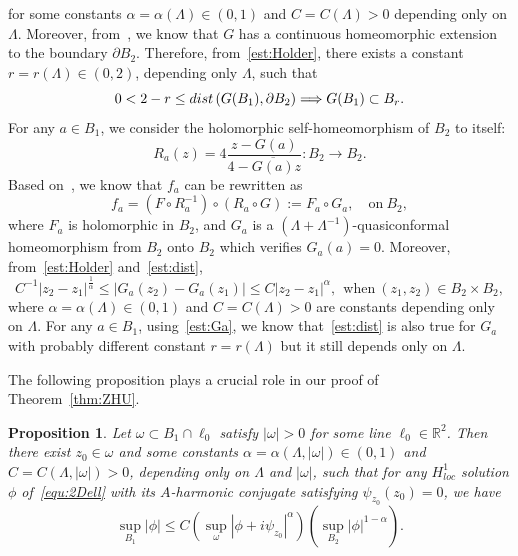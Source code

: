 \documentclass[a4paper,reqno]{amsart}
\newtheorem{proposition}[theorem]{Proposition}
\theoremstyle{definition}
\numberwithin{equation}{section}
\begin{document}
        for some constants $\alpha=\alpha(\Lambda)\in (0,1)$ and $C=C(\Lambda)>0$ depending only on $\Lambda$. Moreover, from~\cite[Corollary 5.9.2]{AIM}, we know that $G$ has a continuous homeomorphic extension to the boundary $\partial B_{2}$. Therefore, from~\eqref{est:Holder}, there exists a constant $r=r(\Lambda)\in (0,2)$, depending only $\Lambda$, such that 
        \begin{equation}\label{est:dist}
          0<2-r\le   {\rm{dist}}\left(G(B_{1}),\partial B_{2}\right)\Longrightarrow G(B_{1})\subset B_{r}.
        \end{equation}
        For any $a\in B_{1}$, we consider the holomorphic self-homeomorphism of $B_{2}$ to itself:
        \begin{equation*}
            R_{a}(z)=4\frac{z-G(a)}{4-\overline{G(a)}z}: B_{2}\to B_{2}.
        \end{equation*}
        Based on~\cite[Theorem 3.1.2]{AIM}, we know that $f_{a}$ can be rewritten as 
        \begin{equation}\label{equ:fFaGa}
            f_{a}=\left(F\circ R_{a}^{-1}\right)\circ (R_{a}\circ G):=F_{a}\circ G_{a},\quad \mbox{on}\ B_{2},
        \end{equation}
        where $F_{a}$ is holomorphic in $B_{2}$, and $G_{a}$ is a $(\Lambda+\Lambda^{-1})$-quasiconformal homeomorphism from $B_{2}$ onto $B_{2}$ which verifies $G_{a}(a)=0$.       Moreover, from~\eqref{est:Holder} and~\eqref{est:dist}, 
        \begin{equation}\label{est:Ga}
            C^{-1}|z_{2}-z_{1}|^{\frac{1}{\alpha}}\le 
            |G_{a}(z_{2})-G_{a}({z_{1}})|\le C|z_{2}-z_{1}|^{\alpha},\ \ \mbox{when}\ (z_{1},z_{2})\in B_{2}\times B_{2},
        \end{equation}
        where $\alpha=\alpha(\Lambda)\in (0,1)$ and $C=C(\Lambda)>0$ are constants depending only on $\Lambda$. For any $a\in B_{1}$, using~\eqref{est:Ga}, we know that~\eqref{est:dist} is also true for $G_{a}$ with probably different constant $r=r(\Lambda)$ but it still depends only on $\Lambda$.

The following proposition plays a crucial role in our proof of Theorem~\ref{thm:ZHU}.

\begin{proposition}\label{prop:ZHU}
    Let $\omega\subset B_{1}\cap \ell_{0}$ satisfy $|\omega|>0$ for some line $\ell_{0}\in \mathbb{R}^{2}$. Then there exist $z_{0}\in \omega$ and some constants $\alpha=\alpha(\Lambda,|\omega|)\in (0,1)$ and
    $C=C(\Lambda,|\omega|)>0$,    
    depending only on $\Lambda$ and $|\omega|$, such that for any $H^{1}_{loc}$ solution $\phi$ of~\eqref{equ:2Dell} with its $A$-harmonic conjugate satisfying $\psi_{z_{0}}(z_{0})=0$, we have 
    \begin{equation*}
        \sup_{B_{1}}|\phi|\le C\left(\sup_{\omega}|\phi+i\psi_{z_{0}}|^{\alpha}\right)\left(\sup_{B_{2}}|\phi|^{1-\alpha}\right).
    \end{equation*}
\end{proposition}
\end{document}

